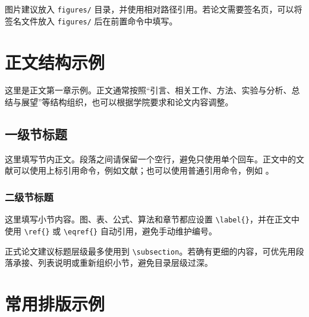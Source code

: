\documentclass[AutoFakeBold]{LZUThesis_xb}
\begin{document}
图片建议放入 \verb|figures/| 目录，并使用相对路径引用。若论文需要签名页，可以将签名文件放入 \verb|figures/| 后在前置命令中填写。

\chapter{正文结构示例}

这里是正文第一章示例。正文通常按照“引言、相关工作、方法、实验与分析、总结与展望”等结构组织，也可以根据学院要求和论文内容调整。

\section{一级节标题}

这里填写节内正文。段落之间请保留一个空行，避免只使用单个回车。正文中的文献可以使用上标引用命令，例如文献；也可以使用普通引用命令，例如 \cite{box2015time}。

\subsection{二级节标题}

这里填写小节内容。图、表、公式、算法和章节都应设置 \verb|\label{}|，并在正文中使用 \verb|\ref{}| 或 \verb|\eqref{}| 自动引用，避免手动维护编号。

正式论文建议标题层级最多使用到 \verb|\subsection|。若确有更细的内容，可优先用段落承接、列表说明或重新组织小节，避免目录层级过深。

\chapter{常用排版示例}
\end{document}
